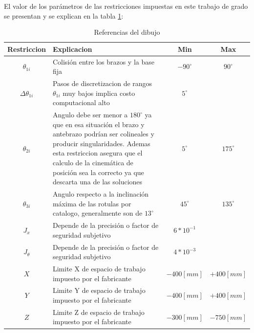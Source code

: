     \newpage
    
    El valor de los parámetros de las restricciones impuestas en este trabajo de grado se presentan y se explican en la tabla \ref{t:cap6_ws_1}: 
    
            \begingroup
            \renewcommand{\arraystretch}{1.5}
            \begin{table}[H]
            \centering
            \begin{tabular}{c m{7.5cm} c c}
               \hline
               \textbf{Restriccion}  & \textbf{Explicacion} & \textbf{Min}& \textbf{Max}\\
               \hline           \hline            
             $\theta_{1i}$ & Colisión entre los brazos y la base fija & $-90^{\circ}$ & $90^{\circ}$\\
            \hline
             $\Delta\theta _{1i}$ & Pasos de discretizacion de rangos $\theta_{1i}$ muy bajos implica costo computacional alto& $5^{\circ}$ & $ $ \\
            \hline
             $\theta _{2i}$ & Angulo debe ser menor a $180^{\circ}$ ya que en esa situación el brazo y antebrazo podrían ser colineales y producir singularidades. Ademas esta restriccion asegura que el calculo de la cinemática de posición sea la correcto ya que descarta una de las soluciones & $5^{\circ}$ & $175^{\circ}$ \\
            \hline
             $\theta _{3i}$ & Angulo respecto a la inclinación máxima de las rotulas por catalogo, generalmente son de $13^{\circ}$ & $45^{\circ}$ & $135^{\circ}$ \\
            \hline
             $J_{x}$ & Depende de la precisión o factor de seguridad subjetivo& $6*10^{-1}$ & $ $ \\
            \hline
             $J_{\theta}$ & Depende de la precisión o factor de seguridad subjetivo& $4*10^{-3}$ & $ $ \\
            \hline
             $X$ & Limite X de espacio de trabajo impuesto por el fabricante & $-400[mm]$ & $+400[mm]$ \\
            \hline            
             $Y$ & Limite Y de espacio de trabajo impuesto por el fabricante & $-400[mm]$ & $+400[mm]$ \\
            \hline   
             $Z$ & Limite Z de espacio de trabajo impuesto por el fabricante & $-300[mm]$ & $-750[mm]$ \\
            \hline   
            \end{tabular}
            \caption{Referencias del dibujo}
            \label{t:cap6_ws_1}
        \end{table}
        \endgroup     
        
